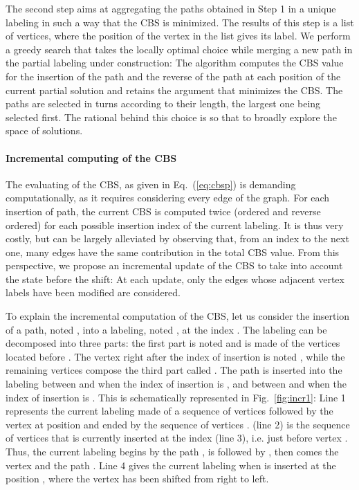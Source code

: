 \documentclass{scrartcl}
\theoremstyle{plain}
\newcommand{\cbs}{CBS}
\begin{document}
The second step aims at aggregating the paths obtained in Step 1 in a unique 
labeling in such a way that the CBS is minimized. The results of this step is a 
list of vertices, where the position of the vertex in the list gives its label. 
We perform a greedy search that takes the locally optimal choice while merging a 
new path in the partial labeling under construction: The algorithm computes the 
\cbs{} value for the insertion of the path and the reverse of the path at each 
position of the current partial solution and retains the argument that minimizes 
the \cbs{}. The paths are selected in turns according to their length, the 
largest one being selected first. The rational behind this choice is so that to 
broadly explore the space of solutions.



\paragraph{Incremental computing of the CBS}

The evaluating of the \cbs{}, as given in Eq.~(\ref{eq:cbsp}) is demanding 
computationally, as it requires considering every edge of the graph. For each 
insertion of path,  the current \cbs{} is computed twice (ordered and reverse 
ordered) for each possible insertion index of the current labeling. It is thus 
very costly, but can be largely alleviated by observing that, from an index to 
the next one, many edges have the same contribution in the total \cbs{} value. 
From this perspective, we propose an incremental update of the \cbs{} to take 
into account the state before the shift: At each update, only the edges whose 
adjacent vertex labels have been modified are considered.

To explain the incremental computation of the \cbs{}, let us consider the 
insertion of a path, noted , into a labeling, noted , at the index . 
The labeling can be decomposed into three parts: the first part is noted  
and is made of the vertices located before . The vertex right after the index 
of insertion  is noted , while the remaining vertices compose the third 
part called . The path  is inserted into the labeling between  and 
 when the index of insertion is , and between  and  when the index 
of insertion is . This is schematically represented in 
Fig.~\ref{fig:incr1}: Line 1 represents the current labeling made of a sequence 
of vertices  followed by the vertex  at position  and ended by the 
sequence of vertices .  (line 2) is the sequence of vertices that is 
currently inserted at the index  (line 3), i.e. just before vertex . Thus, 
the current labeling begins by the path , is followed by , then comes 
the vertex  and the path . Line 4 gives the current labeling when  is 
inserted at the position , where the vertex  has been shifted from right 
to left. 
\end{document}
